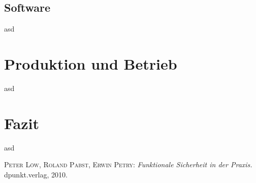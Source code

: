 \documentclass[a4paper,DIV=calc,ngerman]{scrartcl}
\begin{document}
\subsection{Software}
\label{sec:Software}
asd




\section{Produktion und Betrieb}
\label{sec:}
asd





\section{Fazit}
\label{sec:Fazit}
asd




\begin{thebibliography}{------}
\label{sec:Literatur}

 \textsc{Peter Löw, Roland Pabst, Erwin Petry}: {\em Funktionale Sicherheit in der Praxis.} dpunkt.verlag, 2010.

\end{thebibliography}
\end{document}
